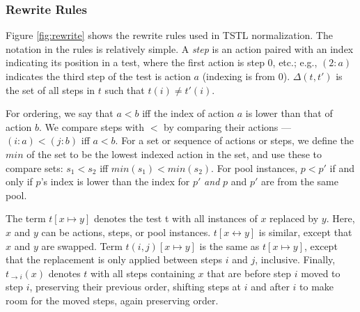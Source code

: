 \subsubsection{Rewrite Rules}

Figure \ref{fig:rewrite} shows the rewrite rules used in TSTL normalization.
The notation in the rules is relatively simple.
A \emph{step} is an action paired with an index indicating its
position in a test,
where the first action is step 0, etc.; e.g., $(2: a)$ indicates the
third step of the test is action $a$ (indexing is from 0). 
$\Delta(t,t')$ is the set of all steps in $t$ such that $t(i) \not= t'(i)$.

For ordering, we say that
$a < b$ iff the index of action $a$ is lower
than that of action $b$.  We compare steps with $<$ by comparing their
actions --- $(i: a) < (j: b)$ iff $a < b$.  For a set or sequence of actions or steps, we define the $min$ of the
set to be the lowest indexed action in the set, and use
these to compare sets:  $s_1 < s_2$ iff $min(s_1) < min(s_2)$. For
pool instances,
$p < p'$ if and only if $p$'s index is lower than the index for $p'$
\emph{and} $p$ and $p'$ are from the same pool.

The term $t[x \mapsto y]$ denotes the test t with all instances of $x$
replaced by $y$.  Here, $x$ and $y$ can be actions, steps, or pool instances.
$t[x \leftrightarrow y]$ is similar, except that $x$ and $y$ are
swapped.  Term $t(i,j)[x \mapsto y]$ is the same as $t[x \mapsto
y]$, except that the replacement is only applied between steps $i$ and
$j$, inclusive.  Finally, $t_{\rightarrow i}(x)$ denotes $t$ with all steps
containing $x$ that are before step $i$ moved to step $i$, preserving
their previous order, shifting steps at $i$ and after $i$ to make room for
the moved steps, again preserving order.


